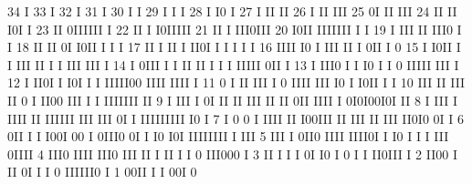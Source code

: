 \begin{Listing}
       34                                    I
       33                                    I
       32                                    I
       31                                    I
       30                                I   I
       29                                I   I  I
       28                                I  I0  I
       27                                I  II II
       26                                I  II III
       25                                0I II III
       24                                II II I0I  I
       23                                II 0IIIIII I
       22                                II I I0IIIII
       21                                II I III0III
       20                                I0II IIIIIII                             I      I
       19                             I   III II III0                             I      I
       18                            II   II  0I I0II                             I    I I
       17                            II I II  I  II0I  I                      I   I    I I
       16                            IIII I0  I   III II                      I   0II  I 0
       15                          I I0II  I  I   III II                   I  I   III  III   I
       14                          I 0III  I  I   II  II                 I I  I IIIII  0II   I
       13                          I III0  I       I  I0                 I I  0 IIIII  III   I
       12                          I II0I  I         I0I                 I I  IIIII00  IIII IIII I
       11                          0 I II            III                 I 0  IIII III I0 I I0II I   I
       10                         III  II            III             II  0 I  II00 III  I I IIIIIII II
        9                       I III  I             0I  II  II     III II II  0II IIII I 0I0I00I0I II
        8                       I III                I  IIII II     IIIIII III III   0I I IIIIIIIII I0 I
        7                       I 0 0                I  IIII II     I00III  II III   II   III II0I0 0I I
        6                       0II I                I  I00I 00 I   0III0   0I I     I0   I0I IIIIIIII I III
        5                       III I                   0II0 IIII  IIII0I I I0        I    I    I III  0IIII
        4                     III0                      IIII III0 III  II I II        I    I       0  III000  I
        3                     II I                      I  I   0I I0   I  0  I                     I  II0III  I
        2                   II00 I                             II 0I      I                        I  0 IIIIII0 I
        1                   00II                                  I                                   I     00I 0
 

\end{Listing}
